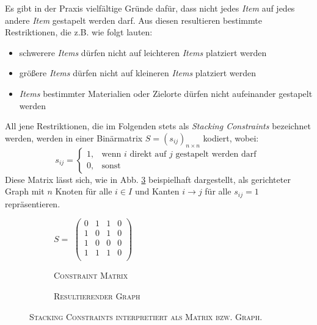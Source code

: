 Es gibt in der Praxis vielfältige Gründe dafür, dass nicht jedes \textit{Item} auf jedes andere \textit{Item} gestapelt werden darf.
Aus diesen resultieren bestimmte Restriktionen, die z.B. wie folgt lauten:
\begin{itemize}
  \item schwerere \textit{Items} dürfen nicht auf leichteren \textit{Items} platziert werden
  \item größere \textit{Items} dürfen nicht auf kleineren \textit{Items} platziert werden
  \item \textit{Items} bestimmter Materialien oder Zielorte dürfen nicht aufeinander gestapelt werden
\end{itemize}

All jene Restriktionen, die im Folgenden stets als \textit{Stacking Constraints} bezeichnet werden, werden in einer Binärmatrix $S = (s_{ij})_{n \times n}$ kodiert, wobei:
\[
    s_{ij} =
\begin{cases}
    1, & \text{wenn $i$ direkt auf $j$ gestapelt werden darf }\\
    0, & \text{sonst}
\end{cases}
\]
Diese Matrix lässt sich, wie in Abb. \ref{fig:matrix_to_graph} beispielhaft dargestellt,
als gerichteter Graph mit $n$ Knoten für alle $i \in I$ und Kanten $i \rightarrow j$ für alle $s_{ij} = 1$ repräsentieren.
\begin{figure}[H]
  \begin{subfigure}[b]{0.5\textwidth}
  \centering
    $S =$
    $\left(
    \begin{array}{rrrr}
    0 & 1 & 1 & 0 \\
    1 & 0 & 1 & 0 \\
    1 & 0 & 0 & 0 \\
    1 & 1 & 1 & 0 \\
    \end{array} \right) $
    \caption{\textsc{Constraint Matrix}}
    \label{fig:constraint_matrix}
  \end{subfigure}
  \hfill
  \begin{subfigure}[b]{0.5\textwidth}
  \centering
    \caption{\textsc{Resultierender Graph}}
    \label{fig:resulting_graph}
  \end{subfigure}
  \caption{\textsc{Stacking Constraints interpretiert als Matrix bzw. Graph.}}
  \label{fig:matrix_to_graph}
\end{figure}
